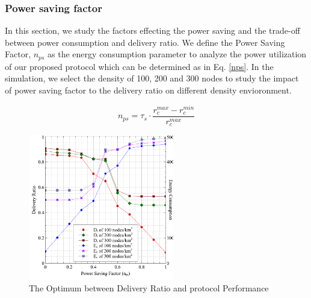 \documentclass[conference]{IEEEtran}
\begin{document}
\subsubsection{Power saving factor}


In this section, we study the factors effecting the power saving and the trade-off between power consumption and delivery ratio.
We define the Power Saving Factor, $n_{ps}$ as the energy consumption parameter to analyze the power utilization of our proposed protocol which can be determined as in Eq. \ref{nps}.
In the simulation, we select the density of 100, 200 and 300 nodes to study the impact of power saving factor to the delivery ratio on different density envioronment.

\begin{equation}
{ n }_{ ps }={ \tau  }_{ s }\cdot \frac { { r }_{ c }^{ max }-{ r }_{ c }^{ min } }{ { r }_{ c }^{ max } } 
\label{nps}
\end{equation}

\begin{figure}[!t]
\centering
\includegraphics[width=2.5in]{Graphs/NpsDeliveryPerformanceAndDeliveryRatio.pdf}
\caption{The Optimum between Delivery Ratio and protocol Performance}
\label{The Optimum between Delivery Ratio and protocol Performance}
\end{figure}
\end{document}
